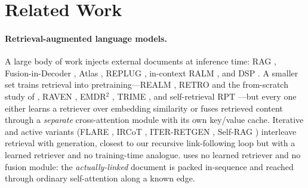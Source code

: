 \section{Related Work}
\label{sec:related}


\paragraph{Retrieval-augmented language models.}
A large body of work injects external documents at inference time: RAG
\citep{lewis2020rag}, Fusion-in-Decoder \citep{izacard2021fid}, Atlas
\citep{izacard2023atlas}, REPLUG \citep{shi2024replug}, in-context RALM
\citep{ram2023incontextralm}, and DSP \citep{khattab2023dsp}. A smaller set trains
retrieval into pretraining---REALM \citep{guu2020realm}, RETRO \citep{borgeaud2022retro}
and the from-scratch study of \citet{wang2023shallwepretrain}, RAVEN
\citep{huang2023raven}, EMDR$^2$ \citep{sachan2021emdr2}, TRIME \citep{zhong2022trime},
and self-retrieval RPT \citep{rubin2023retrievalpretrained}---but every one either
learns a retriever over embedding similarity or fuses retrieved content through a
\emph{separate} cross-attention module with its own key/value cache. Iterative and
active variants (FLARE \citep{jiang2023flare}, IRCoT \citep{trivedi2023ircot},
ITER-RETGEN \citep{shao2023iterretgen}, Self-RAG \citep{asai2024selfrag}) interleave
retrieval with generation, closest to our recursive link-following loop but with a
learned retriever and no training-time analogue. \method uses no learned retriever and
no fusion module: the \emph{actually-linked} document is packed in-sequence and reached
through ordinary self-attention along a known edge.

